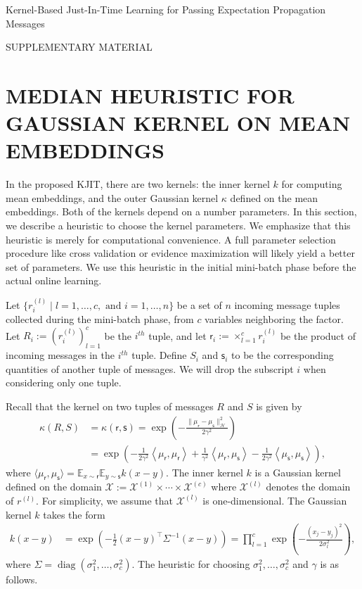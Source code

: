 \documentclass[english]{article}
\theoremstyle{plain}
\theoremstyle{plain}
\newcommand{\diag}{\mathop{\mathrm{diag}}}
\begin{document}
{\Large Kernel-Based Just-In-Time Learning for Passing Expectation Propagation
Messages}

{\large SUPPLEMENTARY MATERIAL}



\section{MEDIAN HEURISTIC FOR GAUSSIAN KERNEL ON MEAN EMBEDDINGS  }
\label{sec:median_heuristic}

In the proposed KJIT, there are two kernels: the inner kernel $k$ for computing
mean embeddings, and the outer Gaussian kernel $\kappa$ defined on the mean
embeddings. Both of the kernels depend on a number parameters. In this section,
we describe a heuristic to choose the kernel parameters. We emphasize that this
heuristic is merely for computational convenience. A full parameter selection
procedure like cross validation or evidence maximization will likely yield a
better set of parameters. We use this heuristic in the initial mini-batch phase
before the actual online learning.

Let $\{ r^{(l)}_{i} \mid l= 1,\ldots, c, \text{ and } i=1,\ldots, n \}$ be a set 
of $n$ incoming message tuples collected during the mini-batch phase, from $c$ variables 
neighboring the factor. Let $R_i := (r^{(l)}_i)_{l=1}^c$ be the $i^{th}$ tuple, and 
let $\mathsf{r}_i := \times_{l=1}^c r^{(l)}_i$ be the product of incoming messages 
in the $i^{th}$ tuple. Define $S_i$ and $\mathsf{s}_i$ to be the corresponding 
quantities of another tuple of messages. We will drop the subscript $i$ when considering 
only one tuple.

Recall that the kernel on two tuples of messages $R$ and $S$ is given by 
\begin{align*}
\kappa(R, S) &= \kappa(\mathsf{r}, \mathsf{s}) =
\exp\left(-\frac{\|\mu_{\mathsf{r}}-
\mu_{\mathsf{s}} \|_{\mathcal{H}}^{2}}{2\gamma^{2}}\right)  \\
%
  &= \exp\left(-\frac{1}{2\gamma^{2}}\left\langle \mu_{\mathsf{r}},
  \mu_{\mathsf{r}}\right\rangle +\frac{1}{\gamma^{2}}\left\langle
  \mu_{\mathsf{r}}, \mu_{\mathsf{s}}\right\rangle
  -\frac{1}{2\gamma^{2}}\left\langle
  \mu_{\mathsf{s}},\mu_{\mathsf{s}}\right\rangle \right),
\end{align*}
%
where 
$\langle \mu_{\mathsf{r}},\mu_{\mathsf{s}}  \rangle
= \mathbb{E}_{x \sim \mathsf{r}} \mathbb{E}_{y \sim \mathsf{s}} 
k(x-y)$. 
The inner kernel $k$ is a Gaussian kernel defined on the domain 
$\mathcal{X} := \mathcal{X}^{(1)} \times \cdots \times \mathcal{X}^{(c)} $
where $\mathcal{X}^{(l)}$ denotes the domain of $r^(l)$. For simplicity, we assume 
that $\mathcal{X}^{(l)}$ is one-dimensional. The Gaussian kernel $k$ takes
the form 
%
\begin{align*}
k(x-y) &= \exp\left(-\frac{1}{2}\left(x-y\right)^{\top}
\Sigma^{-1}\left(x-y\right) \right) 
= \prod_{l=1}^c \exp \left( -\frac{(x_j - y_j)^2}{2 \sigma^2_l}  \right),
\end{align*}
% 
where $\Sigma = \diag(\sigma^2_1, \ldots, \sigma^2_c)$. The heuristic for choosing 
$\sigma^2_1, \ldots, \sigma^2_c$ and $\gamma$ is as follows. 
\end{document}
